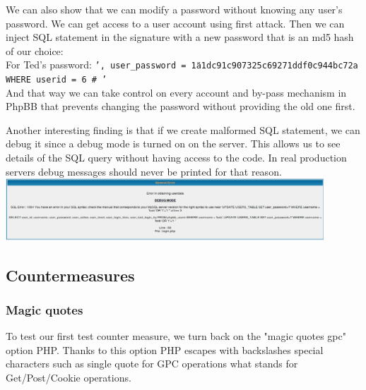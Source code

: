 \documentclass[12pt, a4paper, pdflatex]{article}
\begin{document}
We can also show that we can modify a password without knowing any user's password. We can get access to a user account using first attack. Then we can inject SQL statement in the signature with a new password that is an md5 hash of our choice:\\
For Ted's password: \texttt{', user\_password = \"1a1dc91c907325c69271ddf0c944bc72a WHERE userid = 6 \# '}\\
And that way we can take control on every account and by-pass mechanism in PhpBB that prevents changing the password without providing the old one first.

Another interesting finding is that if we create malformed SQL statement, we can debug it since a debug mode is turned on on the server. This allows us to see details of the SQL query without having access to the code. In real production servers debug messages should never be printed for that reason.\\
\includegraphics[width=450px]{gfx/sql/debug.png}

\subsection{Countermeasures}

\subsubsection{Magic quotes}

To test our first test counter measure, we turn back on the "magic quotes gpc" option PHP. Thanks to this option PHP escapes with backslashes special characters such as single quote for GPC operations what stands for Get/Post/Cookie operations\cite{phpman}.
\end{document}
